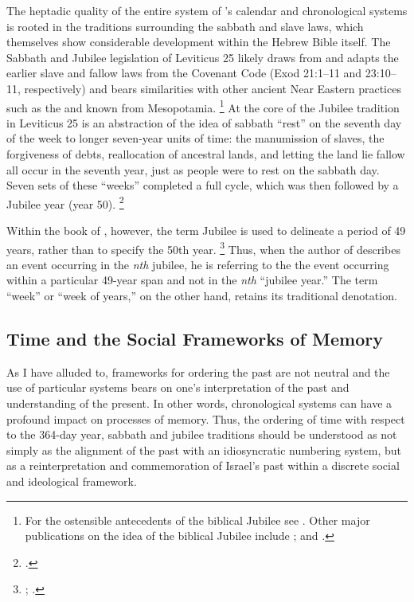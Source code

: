 The heptadic quality of the entire system of \jub's calendar and chronological systems is rooted in the traditions surrounding the sabbath and slave laws, which themselves show considerable development within the Hebrew Bible itself. The Sabbath and Jubilee legislation of Leviticus 25 likely draws from and adapts the earlier slave and fallow laws from the Covenant Code (Exod 21:1--11 and 23:10--11, respectively) and bears similarities with other ancient Near Eastern practices such as the  and  known from Mesopotamia.%
    \footnote{For the ostensible antecedents of the biblical Jubilee see \cite[1--51]{bergsma2007}. Other major publications on the idea of the biblical Jubilee include 
        \cite{north1954};
        \cite{fager1993} and 
        \cite{lefebvre2003}.}
At the core of the Jubilee tradition in Leviticus 25 is an abstraction of the idea of sabbath ``rest'' on the seventh day of the week to longer seven-year units of time: the manumission of slaves, the forgiveness of debts, reallocation of ancestral lands, and letting the land lie fallow all occur in the seventh year, just as people were to rest on the sabbath day. Seven sets of these ``weeks'' completed a full cycle, which was then followed by a Jubilee year (year 50).%
    \footnote{\cite[85--92]{bergsma2007}.}

Within the book of \jub, however, the term Jubilee is used to delineate a period of 49 years, rather than to specify the 50th year.%
    \footnote{%
        \cite[524--525]{vanderkam-b_vanderkam2000};
        \cite[234]{bergsma2007}.}
Thus, when the author of \jub describes an event occurring in the \emph{nth} jubilee, he is referring to the the event occurring within a particular 49-year span and not in the \emph{nth} ``jubilee year.'' The term ``week'' or ``week of years,'' on the other hand, retains its traditional denotation.


\subsection{Time and the Social Frameworks of Memory}
As I have alluded to, frameworks for ordering the past are not neutral and the use of particular systems bears on one's interpretation of the past and understanding of the present. In other words, chronological systems can have a profound impact on processes of memory. Thus, the ordering of time with respect to the 364-day year, sabbath and jubilee traditions should be understood as not simply as the alignment of the past with an idiosyncratic numbering system, but as a reinterpretation and commemoration of Israel's past within a discrete social and ideological framework. 

